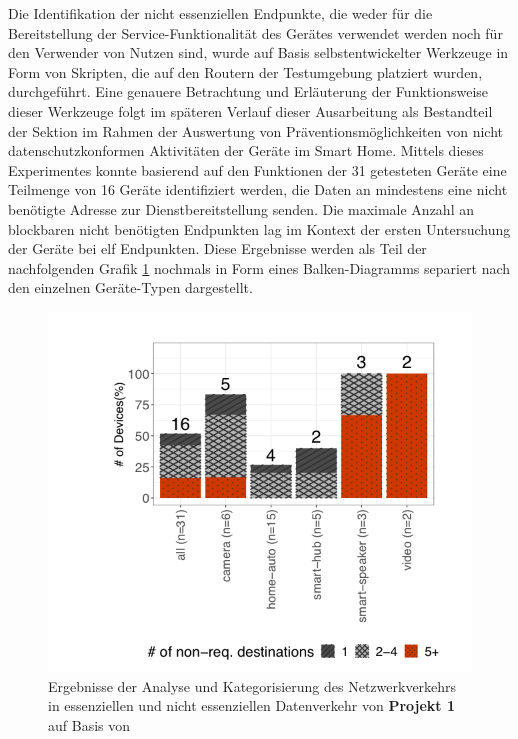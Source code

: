 \noindent Die Identifikation der nicht essenziellen Endpunkte, die weder für die Bereitstellung der Service-Funktionalität des Gerätes verwendet werden noch für den Verwender von Nutzen sind, wurde auf Basis selbstentwickelter Werkzeuge in Form von Skripten, die auf den Routern der Testumgebung platziert wurden, durchgeführt. 
Eine genauere Betrachtung und Erläuterung der Funktionsweise dieser Werkzeuge folgt im späteren Verlauf dieser Ausarbeitung als Bestandteil der Sektion  im Rahmen der Auswertung von Präventionsmöglichkeiten von nicht datenschutzkonformen Aktivitäten der Geräte im Smart Home.
Mittels dieses Experimentes konnte basierend auf den Funktionen der 31 getesteten Geräte eine Teilmenge von 16 Geräte identifiziert werden, die Daten an mindestens eine nicht benötigte Adresse zur Dienstbereitstellung senden. 
Die maximale Anzahl an blockbaren nicht benötigten Endpunkten lag im Kontext der ersten Untersuchung der Geräte bei elf Endpunkten. Diese Ergebnisse werden als Teil der nachfolgenden Grafik \ref{fig:result-non-req-dest} nochmals in Form eines Balken-Diagramms separiert nach den einzelnen Geräte-Typen dargestellt.

\begin{figure}
    \centering
    \includegraphics[scale=0.3]{main/pictures/projekt_one/Non_Required_Traffic}
    \caption{Ergebnisse der Analyse und Kategorisierung des Netzwerkverkehrs in essenziellen und nicht essenziellen Datenverkehr von \textbf{Projekt 1} auf Basis von \cite{Mandalari2021}}
    \label{fig:result-non-req-dest}
\end{figure}

